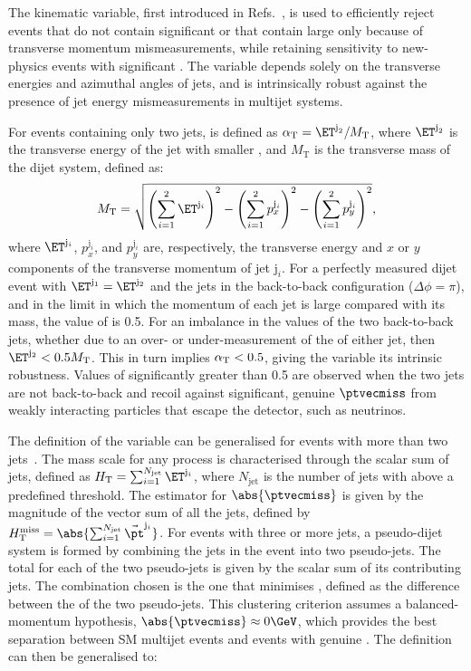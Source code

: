 The \alphat kinematic variable, first introduced in
Refs.~\cite{Randall:2008rw, RA1Paper}, is used to efficiently reject
events that do not contain significant \ptvecmiss or that contain
large \ptvecmiss only because of transverse momentum mismeasurements,
while retaining sensitivity to new-physics events with significant
\ptvecmiss. The \alphat variable depends solely on the transverse
energies
and azimuthal angles of jets, and is intrinsically robust against the
presence of jet energy mismeasurements in multijet systems.

For events containing only two jets, \alphat is defined as $\alphat =
\ET^{\text j_2}/M_\mathrm{T}$, where $\ET^{\text j_2}$ is the transverse
energy
of the jet with smaller \ET, and $M_\mathrm{T}$ is the transverse mass
of the dijet system, defined as:
\begin{equation}
  \label{eq:mt}
  M_\mathrm{T} = \sqrt{ \left( \sum_{i=1}^2 \ET^{\mathrm{j}_i}
    \right)^2 - \left( \sum_{i=1}^2 p_x^{\mathrm{j}_i} \right)^2 - \left(
      \sum_{i=1}^2 p_y^{\mathrm{j}_i} \right)^2},
\end{equation}
where $\ET^{\mathrm{j}_i}$, $p_x^{\mathrm{j}_i}$, and
$p_y^{\mathrm{j}_i}$ are, respectively, the transverse energy and $x$
or $y$ components of the transverse momentum of jet $\mathrm{j}_i$.
For a perfectly measured dijet event with $\ET^{\mathrm{j}_1} =
\ET^{\mathrm{j}_2}$ and the jets in the back-to-back configuration
($\Delta\phi = \pi$), and in the limit in which the momentum of each
jet is large compared with its mass, the value of \alphat is 0.5.  For
an imbalance in the \ET values of the two back-to-back jets, whether
due to an over- or under-measurement of the \ET of either jet, then
$\ET^{\mathrm{j}_2} < 0.5M_\mathrm{T}$. This in turn implies $\alpha_\mathrm{T} <
0.5$, giving the variable its intrinsic robustness. Values of \alphat
significantly greater than 0.5 are observed when the two jets are not
back-to-back and recoil against significant, genuine $\ptvecmiss$ from
weakly interacting particles that escape the detector, such as
neutrinos.

The definition of the \alphat variable can be generalised for events
with more than two jets~\cite{RA1Paper}. The mass scale for any
process is characterised through the scalar \ET sum of jets, defined
as $\scalht = \sum_{i=1}^{N_\text{jet}} \ET^{\mathrm{j}_i}$, where
$N_\text{jet}$ is the number of jets with \ET above a predefined
threshold. The estimator for $\abs{\ptvecmiss}$ is given by the magnitude of
the vector \pt sum of all the jets, defined by $\HTmiss =
\abs{\sum_{i=1}^{N_\text{jet}} \vec{\pt}^{\mathrm{j}_i}}$. For events with
three or more jets, a pseudo-dijet system is formed by combining the
jets in the event into two pseudo-jets. The total \scalht for each of
the two pseudo-jets is given by the scalar \ET sum of its contributing
jets. The combination chosen is the one that minimises \dht, defined
as the difference between the \scalht of the two pseudo-jets. This
clustering criterion assumes a balanced-momentum hypothesis,
$\abs{\ptvecmiss} \approx 0\GeV$, which provides the best separation between
SM multijet events and events with genuine \ptvecmiss. The \alphat
definition can then be generalised to:

